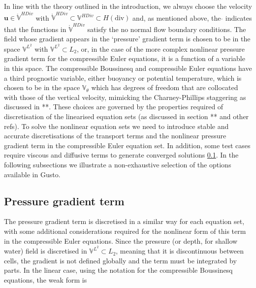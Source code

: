 \documentclass[journal abbreviation, manuscript]{copernicus}
\def\MM#1{\boldsymbol{#1}}
\begin{document}
In line with the theory outlined in the introduction, we always choose
the velocity $\MM{u} \in \ring{\mathbb{V}}^{HDiv}$ with
$\ring{\mathbb{V}}^{HDiv} \subset \mathbb{V}^{HDiv} \subset
H(\text{div})$ and, as mentioned above, the $\ring{}$ indicates that
the functions in $\ring{\mathbb{V}}^{HDiv}$ satisfy the no normal flow
boundary conditions. The field whose gradient appears in the
`pressure' gradient term is chosen to be in the space
$\mathbb{V}^{L^2}$ with $\mathbb{V}^{L^2} \subset L_2$, or, in the
case of the more complex nonlinear pressure gradient term for the
compressible Euler equations, it is a function of a variable in this
space. The compressible Boussinesq and compressible Euler equations
have a third prognostic variable, either buoyancy or potential
temperature, which is chosen to be in the space $\mathbb{V}_\theta$
which has degrees of freedom that are collocated with those of the
vertical velocity, mimicking the Charney-Phillips staggering as
discussed in **. These choices are governed by the properties required
of discretisation of the linearised equation sets (as discussed in
section ** and other refs). To solve the nonlinear equation sets we
need to introduce stable and accurate discretisations of the transport
terms and the nonlinear pressure gradient term in the compressible
Euler equation set. In addition, some test cases require viscous and
diffusive terms to generate converged solutions \ref{}. In the
following subsections we illustrate a non-exhaustive selection of the
options available in Gusto.

\subsection{Pressure gradient term}
The pressure gradient term is discretised in a similar way for each
equation set, with some additional considerations required for the
nonlinear form of this term in the compressible Euler equations. Since
the pressure (or depth, for shallow water) field is discretised in
$\mathbb{V}^{L^2} \subset L_2$, meaning that it is discontinuous between
cells, the gradient is not defined globally and the term must be
integrated by parts. In the linear case, using the notation for the
compressible Boussinesq equations, the weak form is
\end{document}
